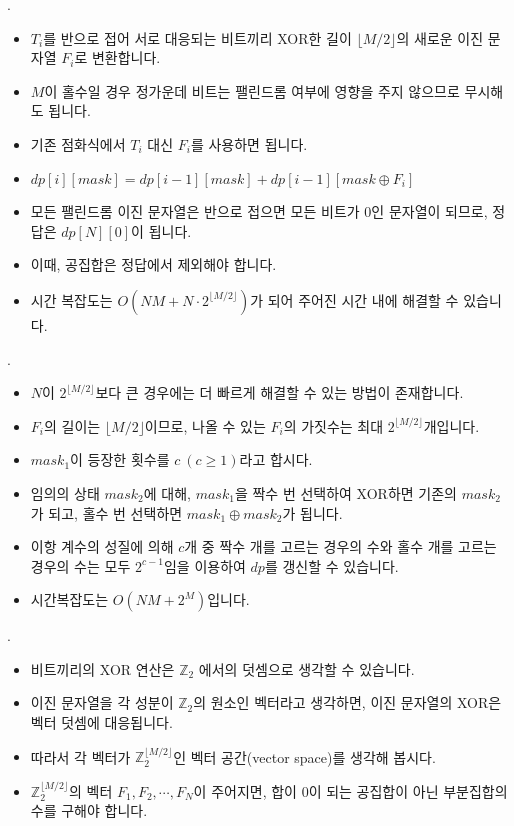 \begin{frame}{\probno{}. \probtitle{}}
    \begin{itemize}
        \item $T_i$를 반으로 접어 서로 대응되는 비트끼리 XOR한 길이 $\lfloor M/2 \rfloor$의 새로운 이진 문자열 $F_i$로 변환합니다.
        \item $M$이 홀수일 경우 정가운데 비트는 팰린드롬 여부에 영향을 주지 않으므로 무시해도 됩니다.
        \item 기존 점화식에서 $T_i$ 대신 $F_i$를 사용하면 됩니다.
        \item $dp[i][mask] = dp[i-1][mask] + dp[i-1][mask \oplus F_i]$
        \item 모든 팰린드롬 이진 문자열은 반으로 접으면 모든 비트가 $0$인 문자열이 되므로, 정답은 $dp[N][0]$이 됩니다. 
        \item 이때, 공집합은 정답에서 제외해야 합니다.
        \item 시간 복잡도는 $O(NM + N \cdot 2^{\lfloor M/2 \rfloor})$가 되어 주어진 시간 내에 해결할 수 있습니다.
    \end{itemize}
\end{frame}

\begin{frame}{\probno{}. \probtitle{}}
    \begin{itemize}
        \item $N$이 $2^{\lfloor M/2 \rfloor}$보다 큰 경우에는 더 빠르게 해결할 수 있는 방법이 존재합니다.
        \item $F_i$의 길이는 $\lfloor M/2 \rfloor$이므로, 나올 수 있는 $F_i$의 가짓수는 최대 $2^{\lfloor M/2 \rfloor}$개입니다.
        \item $mask_1$이 등장한 횟수를 $c\ (c \ge 1)$라고 합시다.
        \item 임의의 상태 $mask_2$에 대해, $mask_1$을 짝수 번 선택하여 XOR하면 기존의 $mask_2$가 되고, 홀수 번 선택하면 $mask_1 \oplus mask_2$가 됩니다.
        \item 이항 계수의 성질에 의해 $c$개 중 짝수 개를 고르는 경우의 수와 홀수 개를 고르는 경우의 수는 모두 $2^{c-1}$임을 이용하여 $dp$를 갱신할 수 있습니다.
        \item 시간복잡도는 $O(NM + 2^{M})$입니다.
    \end{itemize}
\end{frame}

\begin{frame}{\probno{}. }
    \begin{itemize}
        \item 비트끼리의 XOR 연산은 $\mathbb{Z}_2$ 에서의 덧셈으로 생각할 수 있습니다.
        \item 이진 문자열을 각 성분이 $\mathbb{Z}_2$의 원소인 벡터라고 생각하면, 이진 문자열의 XOR은 벡터 덧셈에 대응됩니다.
        \item 따라서 각 벡터가 $\mathbb{Z}_2^{\lfloor M/2 \rfloor}$인 벡터 공간(vector space)를 생각해 봅시다.
        \item $\mathbb{Z}_2^{\lfloor M/2 \rfloor}$의 벡터 $F_1, F_2, \cdots, F_N$이 주어지면, 합이 0이 되는 공집합이 아닌 부분집합의 수를 구해야 합니다.
    \end{itemize}
\end{frame}

